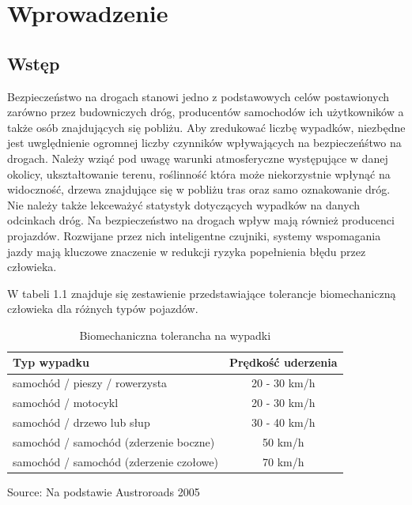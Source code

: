 \chapter{Wprowadzenie}
\label{cha:wprowadzenie}


\section{Wstęp}
\label{sec:wstep}

Bezpieczeństwo na drogach stanowi jedno z podstawowych celów postawionych zarówno przez budowniczych dróg, producentów samochodów ich użytkowników a także osób znajdujących się pobliżu. Aby zredukować liczbę wypadków, niezbędne jest uwględnienie ogromnej liczby czynników wpływających na bezpieczeńśtwo na drogach. Należy wziąć pod uwagę warunki atmosferyczne występujące w danej okolicy, ukształtowanie terenu, roślinność która może niekorzystnie wpłynąć na widoczność, drzewa znajdujące się w pobliżu tras oraz samo oznakowanie dróg. Nie należy także lekceważyć statystyk dotyczących wypadków na danych odcinkach dróg. Na bezpieczeństwo na drogach wpływ mają również producenci projazdów. Rozwijane przez nich inteligentne czujniki, systemy wspomagania jazdy mają kluczowe znaczenie w redukcji ryzyka popełnienia błędu przez człowieka.

W tabeli 1.1 znajduje się zestawienie przedstawiające tolerancje biomechaniczną człowieka dla różnych typów pojazdów.

\newcommand{\source}[1]{\caption*{Source: {#1}} }

\begin{table}[ht]
\centering
\caption{Biomechaniczna tolerancha na wypadki}
\label{my-label}
\begin{tabular}{| l | c |}
\hline
\textbf{Typ wypadku}                    & \multicolumn{1}{l}{\textbf{Prędkość uderzenia}} \\ \hline
samochód / pieszy / rowerzysta          & 20 - 30 km/h                                    \\ \hline
samochód / motocykl                     & 20 - 30 km/h                                    \\ \hline
samochód / drzewo lub słup              & 30 - 40 km/h                                    \\ \hline
samochód / samochód (zderzenie boczne)  & 50 km/h                                         \\ \hline
samochód / samochód (zderzenie czołowe) & 70 km/h   \\ \hline
\end{tabular}
\source{Na podstawie Austroroads 2005}
\end{table}

